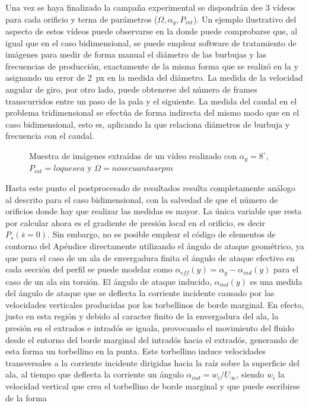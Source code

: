 Una vez se haya finalizado la campaña experimental se dispondrán dee 3 vídeos para cada orificio y terna de parámetros ($\Omega, \alpha_{g},P_{int}$). Un ejemplo ilustrativo del aspecto de estos vídeos puede observarse en la  donde puede comprobarse que, al igual que en el caso bidimensional, se puede emplear software de tratamiento de imágenes para medir de forma manual el diámetro de las burbujas y las frecuencias de producción, exactamente de la misma forma que se realizó en la  y asignando un error de 2~px en la medida del diámetro. La medida de la velocidad angular de giro, por otro lado, puede obtenerse del número de frames transcurridos entre un paso de la pala y el siguiente. La medida del caudal en el problema tridimensional se efectúa de forma indirecta del mismo modo que en el caso bidimensional, esto es, aplicando la  que relaciona diámetros de burbuja y frecuencia con el caudal. 


\begin{figure}
\centering
{}
\caption{Muestra de imágenes extraídas de un vídeo realizado con $\alpha_{g} = 8^{\circ}$, $P_{int} = lo que sea$ y $\Omega = nosecuantasrpm$}
\end{figure}

Hasta este punto el postprocesado de resultados resulta completamente análogo al descrito para el caso bidimensional, con la salvedad de que el número de orificios donde hay que realizar las medidas es mayor. La única variable que resta por calcular ahora es el gradiente de presión local en el orificio, es decir $P_{s}\left(\bar{s}=0\right)$. Sin embargo, no es posible emplear el código de elementos de contorno del Apéndice %
directamente utilizando el ángulo de ataque geométrico, ya que para el caso de un ala de envergadura finita el ángulo de ataque efectivo en cada sección del perfil se puede modelar como $\alpha_{eff}\left(y\right) = \alpha_{g} - \alpha_{ind}\left(y\right)$ para el caso de un ala sin torsión. El ángulo de ataque inducido, $\alpha_{ind}\left(y\right)$ es una medida del ángulo de ataque que se deflecta la corriente incidente causado por las velocidades verticales producidas por los torbellinos de borde marginal. En efecto, justo en esta región y debido al caracter finito de la envergadura del ala, la presión en el extrados e intradós se iguala, provocando el movimiento del fluido desde el entorno del borde marginal del intradós hacia el extradós, generando de esta forma un torbellino en la punta. Este torbellino induce velocidades transversales a la corriente incidente dirigidas hacia la raíz sobre la superficie del ala, al tiempo que deflecta la corriente un ángulo $\alpha_{ind} = w_{i}/U_{\infty}$, siendo $w_{i}$ la velocidad vertical que crea el torbellino de borde marginal y que puede escribirse de la forma

